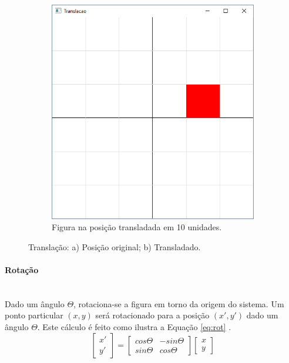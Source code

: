\begin{figure}[H]
\begin{subfigure}[t]{0.25\textwidth}
    \includegraphics[width=.9\textwidth]{img/linear1b}
    \caption{Figura na posição transladada em 10 unidades.} 
  \end{subfigure}
  \label{fig:linear1}
  \caption{Translação: a) Posição original; b) Transladado.} 
\end{figure}

\paragraph{Rotação} \mbox{}\\
Dado um ângulo $\Theta$, rotaciona-se a figura em torno da origem do sistema. Um ponto particular $(x,y)$ será rotacionado para a posição $(x',y')$ dado um ângulo $\Theta$. Este cálculo é feito como ilustra a Equação \ref{eq:rot} \cite{angel6th}.
  \begin{equation} \label{eq:rot}
      \begin{bmatrix}
      x'\\ 
      y'
    \end{bmatrix} 
    = 
    \begin{bmatrix}
      cos\Theta  & -sin\Theta \\ 
      sin\Theta& cos\Theta
    \end{bmatrix}
    \begin{bmatrix}
      x\\ 
      y
    \end{bmatrix}
  \end{equation}

